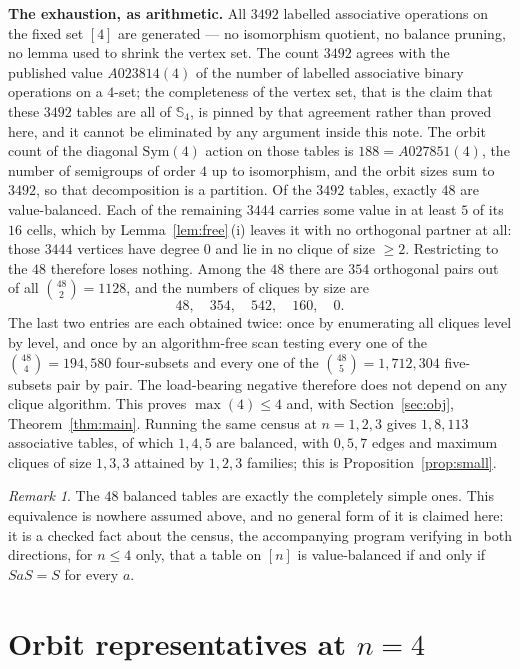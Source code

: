 \documentclass[11pt]{amsart}
\theoremstyle{remark}
\newtheorem*{remark}{Remark}
\theoremstyle{definition}
\newcommand{\Sops}{\mathbb S}
\begin{document}
\noindent\textbf{The exhaustion, as arithmetic.} All $3492$ labelled associative operations on the
fixed set $[4]$ are generated --- no isomorphism quotient, no balance pruning, no lemma used to
shrink the vertex set. The count $3492$ agrees with the published value $A023814(4)$ \cite{OEIS} of
the number of labelled associative binary operations on a $4$-set; the completeness of the vertex
set, that is the claim that these $3492$ tables are all of $\Sops_4$, is pinned by that agreement
rather than proved here, and it cannot be eliminated by any argument inside this note. The orbit
count of the diagonal $\mathrm{Sym}(4)$ action on those tables
is $188=A027851(4)$, the number of semigroups of order $4$ up to isomorphism, and the orbit sizes
sum to $3492$, so that decomposition is a partition. Of the $3492$ tables, exactly $48$ are
value-balanced. Each of the remaining $3444$ carries some value in at least $5$ of its $16$ cells,
which by Lemma~\ref{lem:free}\,(i) leaves it with no orthogonal partner at all: those $3444$
vertices have degree $0$ and lie in no clique of size $\ge2$. Restricting to the $48$ therefore
loses nothing. Among the $48$ there are $354$ orthogonal pairs out of all $\binom{48}{2}=1128$, and
the numbers of cliques by size are
\[
  48,\quad 354,\quad 542,\quad 160,\quad 0 .
\]
The last two entries are each obtained twice: once by enumerating all cliques level by level, and
once by an algorithm-free scan testing every one of the $\binom{48}{4}=194{,}580$ four-subsets and
every one of the $\binom{48}{5}=1{,}712{,}304$ five-subsets pair by pair. The load-bearing negative
therefore does not depend on any clique algorithm. This proves $\max(4)\le4$ and, with
Section~\ref{sec:obj}, Theorem~\ref{thm:main}. Running the same census at $n=1,2,3$ gives
$1,8,113$ associative tables, of which $1,4,5$ are balanced, with $0,5,7$ edges and maximum cliques
of size $1,3,3$ attained by $1,2,3$ families; this is Proposition~\ref{prop:small}.

\begin{remark}
The $48$ balanced tables are exactly the completely simple ones. This equivalence is nowhere assumed
above, and no general form of it is claimed here: it is a checked fact about the census, the
accompanying program verifying in both directions, for $n\le4$ only, that a table on $[n]$ is
value-balanced if and only if $SaS=S$ for every $a$.
\end{remark}

\section{Orbit representatives at $n=4$}\label{sec:class}
\end{document}
